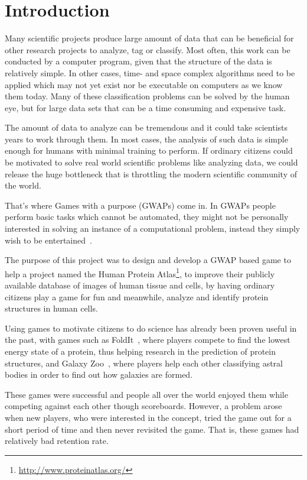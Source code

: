 \section{Introduction}\label{sec:introduction}

Many scientific projects produce large amount of data that can be beneficial for other research projects to analyze, tag or classify. Most often, this work can be conducted by a computer program, given that the structure of the data is relatively simple. In other cases, time- and space complex algorithms need to be applied which may not yet exist nor be executable on computers as we know them today. Many of these classification problems can be solved by the human eye, but for large data sets that can be a time consuming and expensive task.

The amount of data to analyze can be tremendous and it could take scientists years to work through them. In most cases, the analysis of such data is simple enough for humans with minimal training to perform. If ordinary citizens could be motivated to solve real world scientific problems like analyzing data, we could release the huge bottleneck that is throttling the modern scientific community of the world.

That's where Games with a purpose (GWAPs) come in. In GWAPs people perform basic tasks which cannot be automated, they might not be personally interested in solving an instance of a computational problem, instead they simply wish to be entertained~\cite{GWAP}.

The purpose of this project was to design and develop a GWAP based game to help a project named the Human Protein Atlas\footnote{\url{http://www.proteinatlas.org/}}, to improve their publicly available database of images of human tissue and cells, by having ordinary citizens play a game for fun and meanwhile, analyze and identify protein structures in human cells.

Using games to motivate citizens to do science has already been proven useful in the past, with games such as FoldIt~\cite{foldit}, where players compete to find the lowest energy state of a protein, thus helping research in the prediction of protein structures, and Galaxy Zoo~\cite{galaxyzoo}, where players help each other classifying astral bodies in order to find out how galaxies are formed.

These games were successful and people all over the world enjoyed them while competing against each other though scoreboards. However, a problem arose when new players, who were interested in the concept, tried the game out for a short period of time and then never revisited the game. That is, these games had relatively bad retention rate. ~\cite{sauermann}

